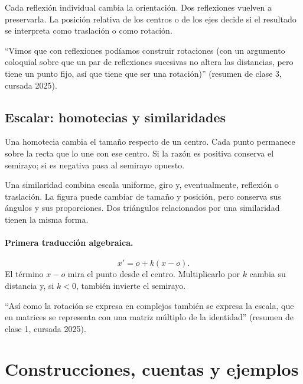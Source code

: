 \begin{idea}
Cada reflexión individual cambia la orientación. Dos reflexiones vuelven a preservarla. La
posición relativa de los centros o de los ejes decide si el resultado se interpreta como
traslación o como rotación.
\end{idea}

\begin{idea}
``Vimos que con reflexiones podíamos construir rotaciones (con un argumento coloquial
sobre que un par de reflexiones sucesivas no altera las distancias, pero tiene un punto
fijo, así que tiene que ser una rotación)'' (resumen de clase 3, cursada 2025).
\end{idea}

\subsection{Escalar: homotecias y similaridades}\label{sec:escalar}

Una homotecia cambia el tamaño respecto de un centro. Cada punto permanece sobre la recta que
lo une con ese centro. Si la razón es positiva conserva el semirayo; si es negativa pasa al
semirayo opuesto.

Una similaridad combina escala uniforme, giro y, eventualmente, reflexión o traslación. La
figura puede cambiar de tamaño y posición, pero conserva sus ángulos y sus proporciones. Dos
triángulos relacionados por una similaridad tienen la misma forma.

\paragraph{Primera traducción algebraica.}
\[
  x'=o+k(x-o).
\]
El término \(x-o\) mira el punto desde el centro. Multiplicarlo por \(k\) cambia su distancia
y, si \(k<0\), también invierte el semirayo.

\begin{idea}
``Así como la rotación se expresa en complejos también se expresa la escala, que en
matrices se representa con una matriz múltiplo de la identidad'' (resumen de clase 1, cursada 2025).
\end{idea}

\section{Construcciones, cuentas y ejemplos}

